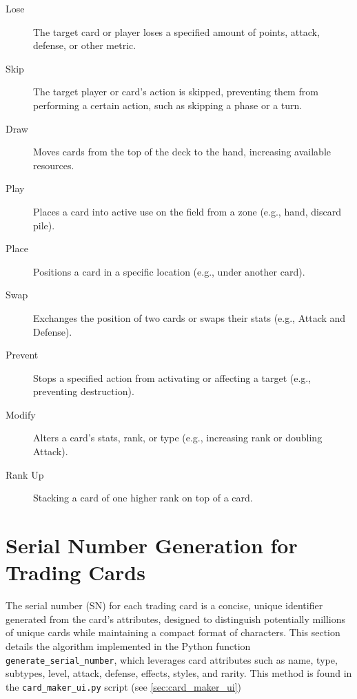 \begin{description}
	\item[Lose] The target card or player loses a specified amount of points, attack, defense, or other metric.  
	\item[Skip] The target player or card’s action is skipped, preventing them from performing a certain action, such as skipping a phase or a turn.
	\item[Draw] Moves cards from the top of the deck to the hand, increasing available resources.
	\item[Play] Places a card into active use on the field from a zone (e.g., hand, discard pile).
	\item[Place] Positions a card in a specific location (e.g., under another card).
	\item[Swap] Exchanges the position of two cards or swaps their stats (e.g., Attack and Defense).
	\item[Prevent] Stops a specified action from activating or affecting a target (e.g., preventing destruction).
	\item[Modify] Alters a card’s stats, rank, or type (e.g., increasing rank or doubling Attack).
	\item[Rank Up] Stacking a card of one higher rank on top of a card.
\end{description}















\section{Serial Number Generation for Trading Cards}
\label{sec:serial_number_generation}

The serial number (SN) for each trading card is a concise, unique identifier generated from the card's attributes, designed to distinguish potentially millions of unique cards while maintaining a compact format of characters. This section details the algorithm implemented in the Python function \texttt{generate\_serial\_number}, which leverages card attributes such as name, type, subtypes, level, attack, defense, effects, styles, and rarity. This method is found in the \texttt{card\_maker\_ui.py} script (see \ref{sec:card_maker_ui})

